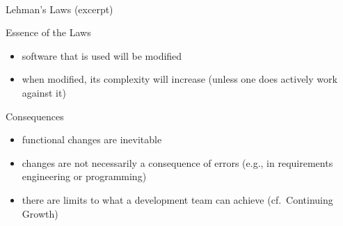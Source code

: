 \begin{frame}{\insertsubsection\ }
\begin{fancycolumns}
\begin{definition}{Lehman's Laws (excerpt)}
		\end{definition}
		\nextcolumn
		\begin{note}{Essence of the Laws}
			\begin{itemize}
				\item software that is used will be modified
				\item when modified, its complexity will increase (unless one does actively work against it)
			\end{itemize}
		\end{note}
		\begin{example}{Consequences}
			\begin{itemize}
				\item functional changes are inevitable
				\item changes are not necessarily a consequence of errors (e.g., in requirements engineering or programming)
				\item there are limits to what a development team can achieve (cf.\ Continuing Growth)
			\end{itemize}
		\end{example}
	\end{fancycolumns}
\end{frame}





















